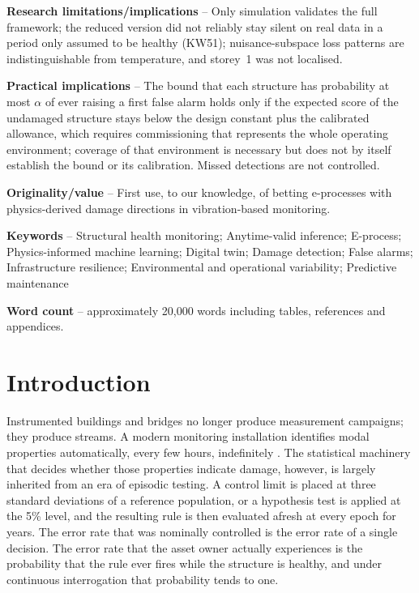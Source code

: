 \documentclass[12pt,a4paper]{article}
\newcommand{\rev}[1]{#1}
\newcommand{\rev}[1]{{\color{revcol}#1}}
\newcommand{\rtwo}[1]{#1}
\newcommand{\rtwo}[1]{{\color{revcolb}#1}}
\begin{document}
\begin{singlespace}
\rtwo{\rtwo{\noindent\textbf{Research limitations/implications} -- Only simulation validates the full framework; the reduced version did not reliably stay silent on real data in a period only assumed to be healthy (KW51); nuisance-subspace loss patterns are indistinguishable from temperature, and storey~1 was not localised.}}

\color{revcolb}\rev{\noindent\textbf{Practical implications} -- The bound that each structure has probability at most $\alpha$ of ever raising a first false alarm holds only if the expected score of the undamaged structure stays below the design constant plus the calibrated allowance, which requires commissioning that represents the whole operating environment; coverage of that environment is necessary but does not by itself establish the bound or its calibration.\color{revcol} \color{revcolb}Missed detections are not controlled.}\color{black}

\rev{\noindent\textbf{Originality/value} -- First use, to our knowledge, of betting e-processes with physics-derived damage directions in vibration-based monitoring.}

\vspace{0.6em}
\noindent\textbf{Keywords} -- Structural health monitoring; Anytime-valid inference; E-process; Physics-informed machine learning; Digital twin; Damage detection; False alarms; Infrastructure resilience; Environmental and operational variability; Predictive maintenance

\vspace{0.4em}
\noindent\textbf{Word count} -- \rev{approximately 20{,}000 words including tables, references and appendices.}
\end{singlespace}

\newpage
\setcounter{page}{1}

\section{Introduction}\label{sec:intro}

Instrumented buildings and bridges no longer produce measurement campaigns; they produce streams. A modern monitoring installation identifies modal properties automatically, every few hours, indefinitely \citep{mishra2022iot}. The statistical machinery that decides whether those properties indicate damage, however, is largely inherited from an era of episodic testing. A control limit is placed at three standard deviations of a reference population, or a hypothesis test is applied at the 5\% level, and the resulting rule is then evaluated afresh at every epoch for years. The error rate that was nominally controlled is the error rate of a single decision. The error rate that the asset owner actually experiences is the probability that the rule ever fires while the structure is healthy, and under continuous interrogation that probability tends to one.
\end{document}
